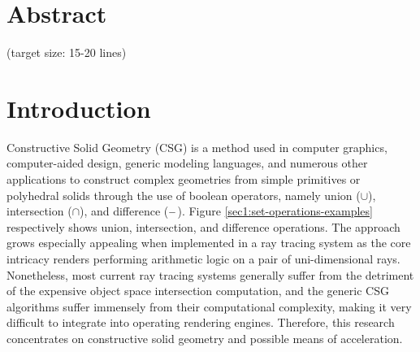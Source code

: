 \documentclass[a4paper,11pt,oneside]{article}
\newcommand{\minus}{\scalebox{0.9}[1.0]{$-$}} %
\begin{document}
\newpage

\section*{Abstract}
  
   
  
(target size: 15-20 lines)

\newpage
\tableofcontents

\clearpage
{}

\section{Introduction}
  
Constructive Solid Geometry (CSG) is a method used in computer graphics, computer-aided design, generic modeling languages, and numerous other applications to construct complex geometries from simple primitives or polyhedral solids through the use of boolean operators, namely union ($\cup$),  intersection ($\cap$), and difference ($\minus$). Figure \ref{sec1:set-operations-examples} respectively shows union, intersection, and difference operations. The approach grows especially appealing when implemented in a ray tracing system as the core intricacy renders performing arithmetic logic on a pair of uni-dimensional rays. Nonetheless, most current ray tracing systems generally suffer from the detriment of the expensive object space intersection computation, and the generic CSG algorithms suffer immensely from their computational complexity, making it very difficult to integrate into operating rendering engines. Therefore, this research concentrates on constructive solid geometry and possible means of acceleration.
  
\end{document}
